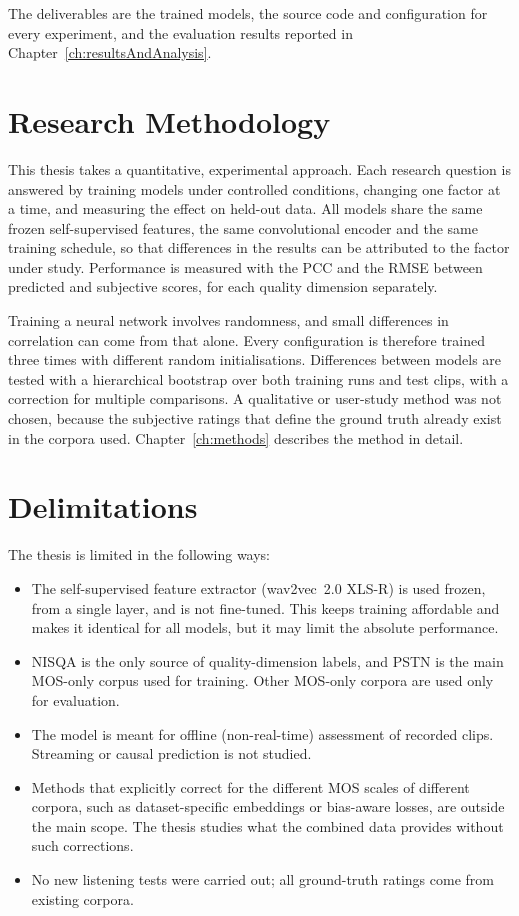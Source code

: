 \documentclass[
english,                 %
bibtex,                  %
includeExtraAbstracts, %
]{kththesis}
\numberwithin{listing}{chapter}
\begin{document}
The deliverables are the trained models, the source code and configuration for every experiment, and the evaluation results reported in Chapter~\ref{ch:resultsAndAnalysis}.

\section{Research Methodology}

This thesis takes a quantitative, experimental approach. Each research question is answered by training models under controlled conditions, changing one factor at a time, and measuring the effect on held-out data. All models share the same frozen self-supervised features, the same convolutional encoder and the same training schedule, so that differences in the results can be attributed to the factor under study. Performance is measured with the \gls{PCC} and the \gls{RMSE} between predicted and subjective scores, for each quality dimension separately.

Training a neural network involves randomness, and small differences in correlation can come from that alone. Every configuration is therefore trained three times with different random initialisations. Differences between models are tested with a hierarchical bootstrap over both training runs and test clips, with a correction for multiple comparisons. A qualitative or user-study method was not chosen, because the subjective ratings that define the ground truth already exist in the corpora used. Chapter~\ref{ch:methods} describes the method in detail.

\section{Delimitations}

The thesis is limited in the following ways:
\begin{itemize}
\item The self-supervised feature extractor (wav2vec~2.0 XLS-R) is used frozen, from a single layer, and is not fine-tuned. This keeps training affordable and makes it identical for all models, but it may limit the absolute performance.
\item NISQA is the only source of quality-dimension labels, and PSTN is the main MOS-only corpus used for training. Other MOS-only corpora are used only for evaluation.
\item The model is meant for offline (non-real-time) assessment of recorded clips. Streaming or causal prediction is not studied.
\item Methods that explicitly correct for the different MOS scales of different corpora, such as dataset-specific embeddings or bias-aware losses, are outside the main scope. The thesis studies what the combined data provides without such corrections.
\item No new listening tests were carried out; all ground-truth ratings come from existing corpora.
\end{itemize}
\end{document}
